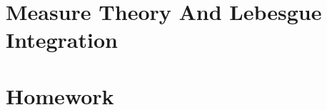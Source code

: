 \documentclass[12pt]{report}
\begin{document}
\tableofcontents

\part{Measure Theory And Lebesgue Integration}
    
    
    
\part{Homework}
    
\end{document}

